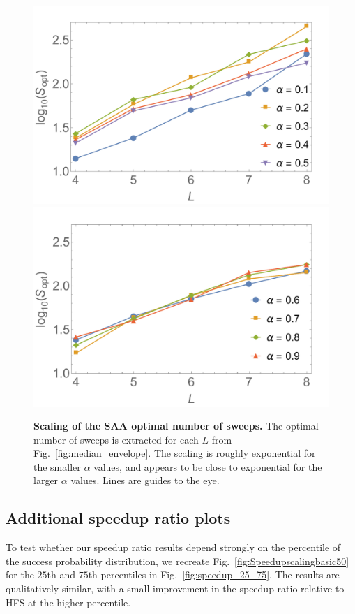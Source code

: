 \begin{figure}[t]
{\includegraphics[width=0.98\columnwidth]{chapters/Planted/SAA-opt-scaling-alpha-small}\label{fig:SAA-opt-small}}\\
{\includegraphics[width=0.98\columnwidth]{chapters/Planted/SAA-opt-scaling-alpha-large}\label{fig:SA-opt-large}}
\caption{\textbf{Scaling of the SAA optimal number of sweeps.} The optimal number of sweeps is extracted for each $L$ from Fig.~\ref{fig:median_envelope}.
The scaling is roughly exponential for the smaller $\alpha$ values, and appears to be close to exponential for the larger $\alpha$ values. Lines are guides to the eye.}
\label{fig:SAA-opt-scaling}
\end{figure}
%

\subsection{Additional speedup ratio plots} \label{sec:speedup}
To test whether our speedup ratio results depend strongly on the percentile of the success probability distribution, we recreate Fig.~\ref{fig:Speedupscalingbasic50} for the $25$th and $75$th percentiles in Fig.~\ref{fig:speedup_25_75}. The results are qualitatively similar, with a small improvement in the speedup ratio relative to HFS at the higher percentile.


